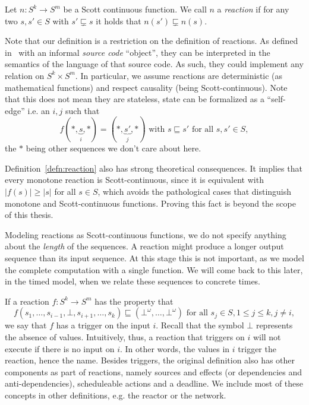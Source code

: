 \begin{defn}[Reaction]
    \label{defn:reaction}
Let $n : S^k \rightarrow S^m$ be a Scott continuous function. 
We call $n$ a \emph{reaction} if for any two $s, s' \in S$ with $s' \sqsubsetneq s$ it holds that $n(s') \sqsubsetneq n(s)$.
\end{defn}

Note that our definition is a restriction on the definition of reactions.
As defined in~\cite{lohstroh_cyphy19} with an informal \emph{source code} ``object'', they can be interpreted in the semantics of the language of that source code.
As such, they could implement any relation on $S^k \times S^m$.
In particular, we assume reactions are deterministic (as mathematical functions) and respect causality (being Scott-continuous).
Note that this does not mean they are stateless, state can be formalized as a ``self-edge'' i.e. an $i,j$ such that
\[ f(*,\underbrace{s}_{i},*) = (*,\underbrace{s'}_{j},*) \text{ with } s \sqsubseteq s' \text{ for all } s,s' \in S, \]
the $*$ being other sequences we don't care about here.

Definition~\ref{defn:reaction} also has strong theoretical consequences.
It implies that every monotone reaction is Scott-continuous, since it is equivalent with $|f(s)| \geq |s|$ for all $s \in S$, which avoids the pathological cases that distinguish monotone and Scott-continuous functions.
Proving this fact is beyond the scope of this thesis.

Modeling reactions as Scott-continuous functions, we do not specify anything about the \emph{length} of the sequences.
A reaction might produce a longer output sequence than its input sequence. At this stage this is not important, as we model the complete computation with a single function.
We will come back to this later, in the timed model, when we relate these sequences to concrete times.

If a reaction $f : S^k \rightarrow S^m$ has the property that
\[ f(s_1,\ldots,s_{i-1},\bot,s_{i+1},\ldots,s_k) \sqsubseteq (\bot^\omega,\ldots,\bot^\omega)\text{ for all }s_j \in S, 1 \leq j \leq k, j \neq i,\]
 we say that $f$ has a trigger on the input $i$.
Recall that the symbol $\bot$ represents the absence of values.
Intuitively, thus, a reaction that triggers on $i$ will not execute if there is no input on $i$.
In other words, the values in $i$ trigger the reaction, hence the name.
Besides triggers, the original definition also has other components as part of reactions, namely sources and effects (or dependencies and anti-dependencies), scheduleable actions and a deadline.
We include most of these concepts in other definitions, e.g. the reactor or the network.

